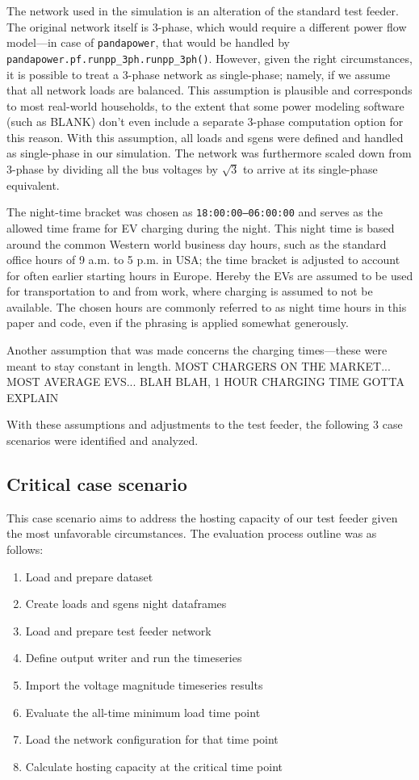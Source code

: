 \documentclass[a4paper,10pt]{report}
\begin{document}
The network used in the simulation is an alteration of the standard test feeder. The original network itself is 3-phase, which would require a different power flow model---in case of \texttt{pandapower}, that would be handled by \texttt{pandapower.pf.runpp\_3ph.runpp\_3ph()}. However, given the right circumstances, it is possible to treat a 3-phase network as single-phase; namely, if we assume that all network loads are balanced. This assumption is plausible and corresponds to most real-world households, to the extent that some power modeling software (such as BLANK) don't even include a separate 3-phase computation option for this reason. With this assumption, all loads and sgens were defined and handled as single-phase in our simulation. The network was furthermore scaled down from 3-phase by dividing all the bus voltages by $\sqrt{3}$ to arrive at its single-phase equivalent.

The night-time bracket was chosen as \texttt{18:00:00--06:00:00} and serves as the allowed time frame for EV charging during the night. This night time is based around the common Western world business day hours, such as the standard office hours of 9 a.m. to 5 p.m. in USA; the time bracket is adjusted to account for often earlier starting hours in Europe. Hereby the EVs are assumed to be used for transportation to and from work, where charging is assumed to not be available. The chosen hours are commonly referred to as night time hours in this paper and code, even if the phrasing is applied somewhat generously.

Another assumption that was made concerns the charging times---these were meant to stay constant in length. MOST CHARGERS ON THE MARKET... MOST AVERAGE EVS... BLAH BLAH, 1 HOUR CHARGING TIME GOTTA EXPLAIN

With these assumptions and adjustments to the test feeder, the following 3 case scenarios were identified and analyzed.

\subsection{Critical case scenario}
This case scenario aims to address the hosting capacity of our test feeder given the most unfavorable circumstances. The evaluation process outline was as follows:
\begin{enumerate}
	\item Load and prepare dataset
	\item Create loads and sgens night dataframes
	\item Load and prepare test feeder network
	\item Define output writer and run the timeseries
	\item Import the voltage magnitude timeseries results
	\item Evaluate the all-time minimum load time point
	\item Load the network configuration for that time point
	\item Calculate hosting capacity at the critical time point
\end{enumerate}
\end{document}

